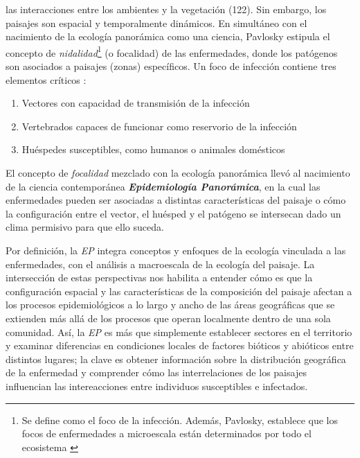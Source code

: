   las interacciones entre los ambientes y la vegetación (122).
  Sin embargo, los paisajes son espacial y temporalmente dinámicos.
  En simultáneo con el nacimiento de la ecología panorámica como una ciencia,
  Pavlosky estipula el concepto de \textit{nidalidad}\footnote{Se define como
  el foco de la infección. Además, Pavlosky, establece que los focos de
  enfermedades a microescala están determinados por todo el ecosistema \cite{nidality}}
  (o focalidad) de las enfermedades, donde los patógenos son asociados
  a paisajes (zonas) específicos. Un foco de infección contiene tres elementos
  críticos \cite{reisen_landscape}:
  \begin{enumerate}
    \item Vectores con capacidad de transmisión de la infección
    \item Vertebrados capaces de funcionar como reservorio de la infección
    \item Huéspedes susceptibles, como humanos o animales domésticos
  \end{enumerate}
  El concepto de \textit{focalidad} mezclado con la ecología panorámica
  llevó al nacimiento de la ciencia contemporánea
  \textbf{\textit{Epidemiología Panorámica}}, en la cual las enfermedades
  pueden ser asociadas a distintas características del paisaje o cómo
  la configuración entre el vector, el huésped y el patógeno se intersecan
  dado un clima permisivo para que ello suceda.

\par Por definición, la \textit{EP} integra conceptos y
  enfoques de la ecología vinculada a las enfermedades, con el análisis a
  macroescala de la ecología del paisaje. La intersección de estas perspectivas
  nos habilita a entender cómo es que la configuración espacial y las
  características de la composición del paisaje afectan a los procesos
  epidemiológicos a lo largo y ancho de las áreas geográficas que se
  extienden más allá de los procesos que operan localmente dentro de una sola comunidad.
  Así, la \textit{EP} es más que simplemente establecer
  sectores en el territorio y examinar diferencias en condiciones locales de
  factores bióticos y abióticos entre distintos lugares; la clave es obtener
  información sobre la distribución geográfica de la enfermedad y comprender
  cómo las interrelaciones de los paisajes influencian las intereacciones entre
  individuos susceptibles e infectados.

